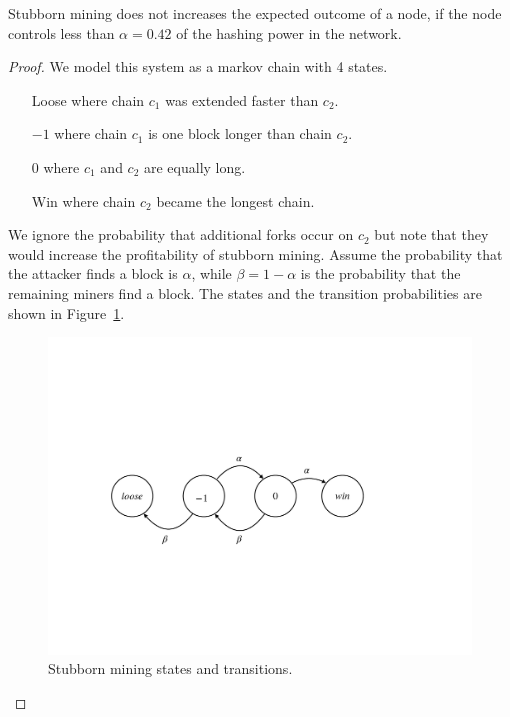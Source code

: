 \begin{theorem}
	
	Stubborn mining does not increases the expected outcome of a node, if
	the node controls less than $\alpha=0.42$ of the hashing power in the network.
	
\end{theorem}
\begin{proof}
	We model this system as a markov chain with 4 states.
	\begin{itemize}
		\item[Loose] where chain $c_1$ was extended faster than $c_2$.
		\item[$-1$] where chain $c_1$ is one block longer than chain $c_2$.
		\item[$0$] where $c_1$ and $c_2$ are equally long.
		\item[Win] where chain $c_2$ became the longest chain.
	\end{itemize}
	
	We ignore the probability that additional forks occur on $c_2$ but 
	note that they would increase the profitability of stubborn mining.
	Assume the probability that the attacker finds a block is $\alpha$,
	while $\beta=1-\alpha$ is the probability that the remaining miners find a block. The states and the transition probabilities are shown in Figure~\ref{fig:stubborn}.
	\begin{figure}
	\includegraphics[width=\textwidth]{fig/StubbornMining}
	\caption{Stubborn mining states and transitions.}
	\label{fig:stubborn}
	\end{figure}
	

\end{proof}
